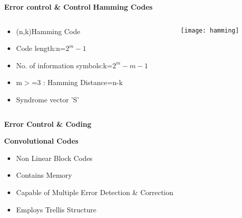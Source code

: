 \documentclass{beamer}
\begin{document}
\begin{frame}{\scriptsize \LARGE \centering \textbf{Error control \& Control}}
\textbf{Hamming Codes}
\begin{columns}
\begin{column}{6cm}
		\begin{itemize}
		 	\pause
		 	\item (n,k)Hamming Code
		 	\pause
		 	\item Code length:n=$2^m-1$
		 	\item No. of information symbols:k=$2^m-m-1$
		 	\item m$>$=3 : Hamming Distance=n-k
		 	\pause
		 	\item Syndrome vector 'S'
		 	\pause
		 	
		\end{itemize}
		\end{column}
		\begin{column}{5cm}
		\begin{center}
		\texttt{[image: hamming]}
		\end{center}
		
		\end{column}
		\end{columns}
\end{frame}


\begin{frame}{\scriptsize \LARGE \centering \textbf{Error Control \& Coding}}
	\begin{block}{\textbf{Convolutional Codes}}
		\begin{itemize}
			\pause
			\item Non Linear Block Codes 
			\pause
			\item Contains Memory
			\pause
			\item Capable of Multiple Error Detection \& Correction 
			\pause
			\item Employs Trellis Structure
			\pause
\end{itemize}			
	\end{block}
\end{frame}
\end{document}
